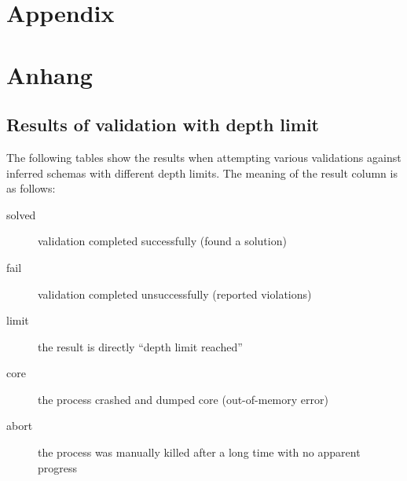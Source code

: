 
{\chapter{Appendix}}    %
{\chapter{Anhang}}      %
\label{chap:appendix}

\section{Results of validation with depth limit}
\label{sec:appendix:depth-limit}

The following tables show the results
when attempting various validations against inferred \glspl{schema}
with different depth limits.
The meaning of the result column is as follows:

\begin{description}
\item[solved] validation completed successfully (found a solution)
\item[fail] validation completed unsuccessfully (reported violations)
\item[limit] the result is directly “depth limit reached” %
\item[core] the process crashed and dumped core (out-of-memory error)
\item[abort] the process was manually killed after a long time with no apparent progress
\end{description}

